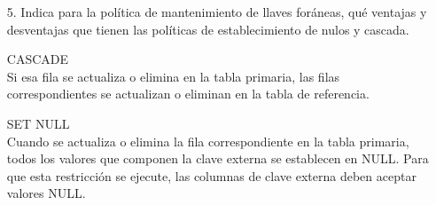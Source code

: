 \documentclass[12pt, letterpaper]{article}
\begin{document}
\begin{itemize}
			
		\item[5.] Indica para la política de mantenimiento de llaves foráneas, qué ventajas y desventajas que tienen
		las políticas de establecimiento de nulos y cascada. \vspace{.2cm}

		CASCADE \\
		Si esa fila se actualiza o elimina en la tabla primaria, las filas correspondientes se actualizan o eliminan en la tabla de referencia.\vspace{.3cm}

		SET NULL \\
        Cuando se actualiza o elimina la fila correspondiente en la tabla primaria, todos los valores que componen la clave externa se establecen en NULL. Para que esta restricción se ejecute, las columnas de clave externa deben aceptar valores NULL.
\end{itemize}
\end{document}
